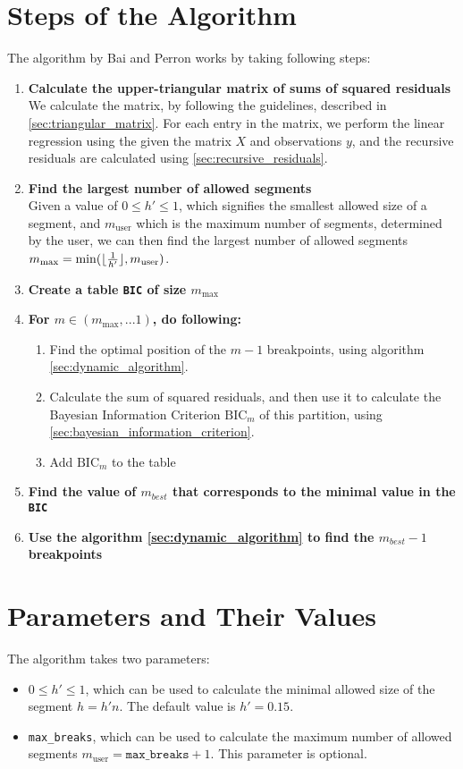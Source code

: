 \documentclass[main.tex]{subfiles}
\begin{document}
\section{Steps of the Algorithm}
\label{sec:steps_of_the_algorithm}
The algorithm by Bai and Perron works by taking following steps:
\begin{enumerate}
\item \textbf{Calculate the upper-triangular matrix of sums of squared residuals}\\
  We calculate the matrix, by following the guidelines, described in \ref{sec:triangular_matrix}.
  For each entry in the matrix, we perform the linear regression using the given the matrix
  $X$ and observations $y$, and the recursive residuals are calculated 
  using \ref{sec:recursive_residuals}.
\item \textbf{Find the largest number of allowed segments}\\
  Given a value of $0\leq h' \leq 1$, which signifies the smallest allowed size of
  a segment, and $m_{\text{user}}$ which is the maximum number of segments, determined by the user, 
  we can then find the largest number of allowed
  segments $m_{\text{max}} = \min(\lfloor\frac{1}{h'}\rfloor, m_{\text{user}})$.
\item \textbf{Create a table \texttt{BIC} of size $m_{\text{max}}$}
\item \textbf{For $m \in (m_{\text{max}}, ... 1)$, do following:}
  \begin{enumerate}[1)]
  \item Find the optimal position of the $m-1$ breakpoints, using algorithm
    \ref{sec:dynamic_algorithm}.
  \item Calculate the sum of squared residuals, and then use it to
    calculate the Bayesian Information Criterion $\text{BIC}_m$ of this partition, using
    \ref{sec:bayesian_information_criterion}.
  \item Add $\text{BIC}_m$ to the table
  \end{enumerate}
\item \textbf{Find the value of $m_{best}$ that corresponds to the minimal value in the \texttt{BIC}}
\item \textbf{Use the algorithm \ref{sec:dynamic_algorithm} to find the $m_{best} - 1$ breakpoints}
\end{enumerate}

\section{Parameters and Their Values}
\label{sec:breakpoints_params}
The algorithm takes two parameters:
\begin{itemize}
\item  $0\leq h' \leq 1$, which can be used to calculate the minimal allowed size of the segment
  $h = h' n$. The default value is $h' = 0.15$.
\item \texttt{max\_breaks}, which can be used to calculate the maximum number of allowed segments
  $m_{\text{user}} = \texttt{max\_breaks} + 1$. This parameter is optional.
\end{itemize}



\biblio
\end{document}
